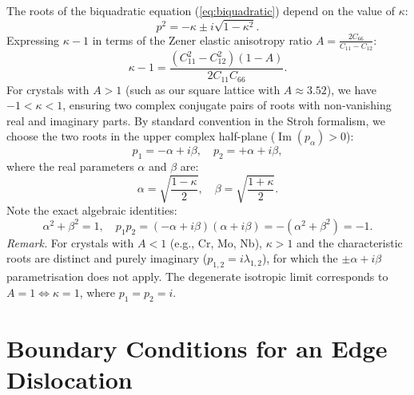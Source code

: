 \documentclass[11pt,a4paper]{article}
\begin{document}
The roots of the biquadratic equation (\ref{eq:biquadratic}) depend on the value of $\kappa$:
\begin{equation}
p^2 = -\kappa \pm i \sqrt{1 - \kappa^2}.
\end{equation}
Expressing $\kappa - 1$ in terms of the Zener elastic anisotropy ratio $A = \frac{2 C_{66}}{C_{11} - C_{12}}$:
\begin{equation}
\kappa - 1 = \frac{(C_{11}^2 - C_{12}^2)(1 - A)}{2 C_{11} C_{66}}.
\end{equation}
For crystals with $A > 1$ (such as our square lattice with $A \approx 3.52$), we have $-1 < \kappa < 1$, ensuring two complex conjugate pairs of roots with non-vanishing real and imaginary parts. By standard convention in the Stroh formalism, we choose the two roots in the upper complex half-plane ($\operatorname{Im}(p_\alpha) > 0$):
\begin{equation}
p_1 = -\alpha + i \beta, \quad p_2 = +\alpha + i \beta,
\end{equation}
where the real parameters $\alpha$ and $\beta$ are:
\begin{equation}
\alpha = \sqrt{\frac{1 - \kappa}{2}}, \quad \beta = \sqrt{\frac{1 + \kappa}{2}}.
\end{equation}
Note the exact algebraic identities:
\begin{equation}
\alpha^2 + \beta^2 = 1, \quad p_1 p_2 = (-\alpha + i\beta)(\alpha + i\beta) = -(\alpha^2 + \beta^2) = -1.
\end{equation}
\noindent\textit{Remark.} For crystals with $A < 1$ (e.g., Cr, Mo, Nb), $\kappa > 1$ and the characteristic roots are distinct and purely imaginary ($p_{1,2} = i\lambda_{1,2}$), for which the $\pm\alpha + i\beta$ parametrisation does not apply. The degenerate isotropic limit corresponds to $A = 1 \iff \kappa = 1$, where $p_1 = p_2 = i$.

\section{Boundary Conditions for an Edge Dislocation}
\end{document}

